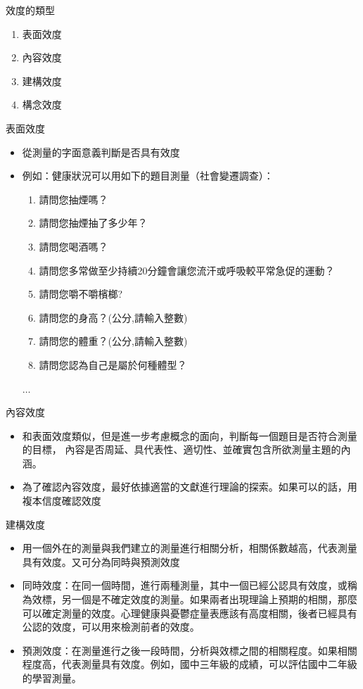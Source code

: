 \documentclass[xcolor=dvipsnames, 13pt]{beamer}
\begin{document}
\begin{frame}{效度的類型}
\begin{enumerate}
\item 表面效度
\item 內容效度
\item 建構效度
\item 構念效度
\end{enumerate}
\end{frame}
\begin{frame}{表面效度}
\begin{itemize}
\item 從測量的字面意義判斷是否具有效度
\item 例如：健康狀況可以用如下的題目測量（社會變遷調查）：
\begin{enumerate}
\item 請問您抽煙嗎？
\item 請問您抽煙抽了多少年？
\item 請問您喝酒嗎？
\item 請問您多常做至少持續20分鐘會讓您流汗或呼吸較平常急促的運動？
\item 請問您嚼不嚼檳榔?
\item 請問您的身高？(公分,請輸入整數)
\item 請問您的體重？(公分,請輸入整數)
\item 請問您認為自己是屬於何種體型？
\end{enumerate}
$\dots$
\end{itemize}
\end{frame}
\begin{frame}{內容效度}
\begin{itemize}
\item 和表面效度類似，但是進一步考慮概念的面向，判斷每一個題目是否符合測量的目標，
內容是否周延、具代表性、適切性、並確實包含所欲測量主題的內涵。
\item 為了確認內容效度，最好依據適當的文獻進行理論的探索。如果可以的話，用複本信度確認效度
\end{itemize}
\end{frame}
\begin{frame}{建構效度}
\begin{itemize}
\item 用一個外在的測量與我們建立的測量進行相關分析，相關係數越高，代表測量具有效度。又可分為同時與預測效度
\item 同時效度：在同一個時間，進行兩種測量，其中一個已經公認具有效度，或稱為效標，另一個是不確定效度的測量。如果兩者出現理論上預期的相關，那麼可以確定測量的效度。心理健康與憂鬱症量表應該有高度相關，後者已經具有公認的效度，可以用來檢測前者的效度。
\item 預測效度：在測量進行之後一段時間，分析與效標之間的相關程度。如果相關程度高，代表測量具有效度。例如，國中三年級的成績，可以評估國中二年級的學習測量。
\end{itemize}
\end{frame}
\end{document}
